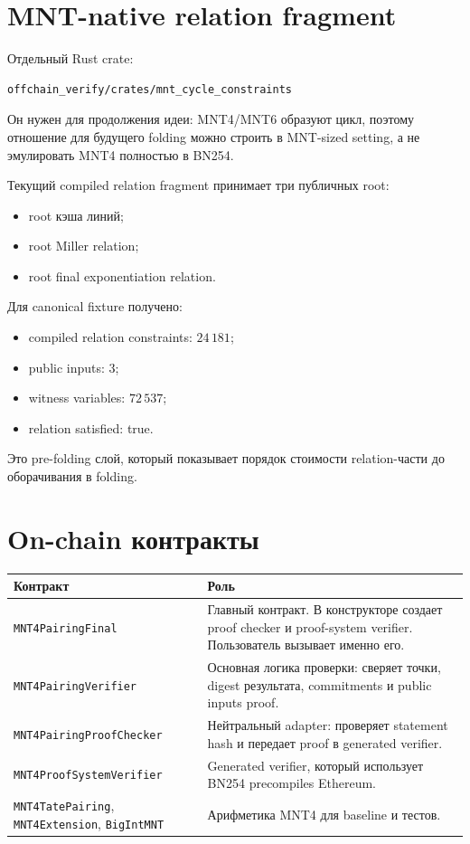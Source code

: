 \documentclass[12pt,a4paper]{article}
\begin{document}
\section{MNT-native relation fragment}
Отдельный Rust crate:
\begin{lstlisting}
offchain_verify/crates/mnt_cycle_constraints
\end{lstlisting}

Он нужен для продолжения идеи: MNT4/MNT6 образуют цикл, поэтому отношение для будущего folding можно строить в MNT-sized setting, а не эмулировать MNT4 полностью в BN254.

Текущий compiled relation fragment принимает три публичных root:
\begin{itemize}
    \item root кэша линий;
    \item root Miller relation;
    \item root final exponentiation relation.
\end{itemize}

Для canonical fixture получено:
\begin{itemize}
    \item compiled relation constraints: $24\,181$;
    \item public inputs: $3$;
    \item witness variables: $72\,537$;
    \item relation satisfied: true.
\end{itemize}

Это pre-folding слой, который показывает порядок стоимости relation-части до оборачивания в folding.

\section{On-chain контракты}
\footnotesize
\begin{longtable}{L{0.28\textwidth}L{0.62\textwidth}}
\toprule
\textbf{Контракт} & \textbf{Роль} \\
\midrule
\texttt{MNT4PairingFinal} & Главный контракт. В конструкторе создает proof checker и proof-system verifier. Пользователь вызывает именно его. \\
\texttt{MNT4PairingVerifier} & Основная логика проверки: сверяет точки, digest результата, commitments и public inputs proof. \\
\texttt{MNT4PairingProofChecker} & Нейтральный adapter: проверяет statement hash и передает proof в generated verifier. \\
\texttt{MNT4ProofSystemVerifier} & Generated verifier, который использует BN254 precompiles Ethereum. \\
\texttt{MNT4TatePairing}, \texttt{MNT4Extension}, \texttt{BigIntMNT} & Арифметика MNT4 для baseline и тестов. \\
\bottomrule
\end{longtable}
\normalsize
\end{document}

